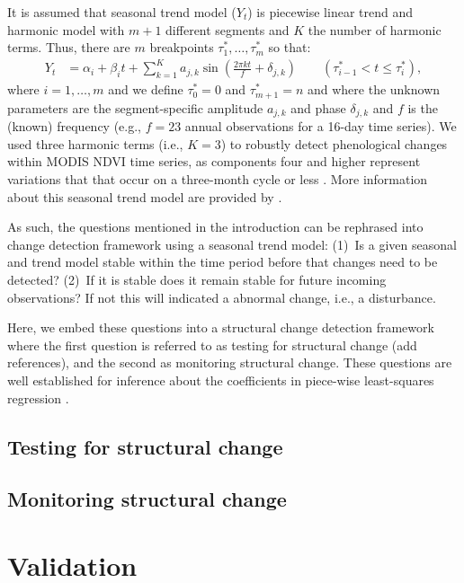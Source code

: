 \documentclass[authoryear,preprint,review,10pt]{elsarticle}
\begin{document}
It is assumed that seasonal trend model ($Y_t$) is piecewise linear trend and
harmonic model with $m+1$ different segments and $K$ the number of harmonic
terms. Thus, there are $m$ breakpoints $\tau_1^*, \dots, \tau_m^*$ so that:
%
\begin{align} \label{lmod}
  Y_t & = \alpha_i + \beta_i t + \sum_{k=1}^K a_{j,k} \sin\left(\frac{2\pi kt}{f}+\delta_{j,k}\right)  \qquad (\tau_{i-1}^* < t \leq \tau_i^*),
\end{align}
%
where $i = 1, \dots, m$ and we define $\tau_0^* = 0$ and $\tau_{m+1}^* = n$ and
where the unknown parameters are the segment-specific amplitude $a_{j,k}$ and
phase $\delta_{j,k}$ and $f$ is the (known) frequency (e.g., $f=23$ annual
observations for a 16-day time series). We used three harmonic terms (i.e.,
$K=3$) to robustly detect phenological changes within MODIS NDVI time series, as
components four and higher represent variations that that occur on a three-month
cycle or less \citep{Geerken2009,Julien2010}. More information about this
seasonal trend model are provided by \citet{Verbesselt:2010wo}.

As such, the questions mentioned in the introduction can be rephrased into
change detection framework using a seasonal trend model: (1)~Is a given seasonal
and trend model stable within the time period before that changes need to be
detected?  (2)~If it is stable does it remain stable for future incoming
observations? If not this will indicated a abnormal change, i.e., a disturbance.

Here, we embed these questions into a structural change detection framework
where the first question is referred to as testing for structural change (add
references), and the second as monitoring structural change. These questions are
well established for inference about the coefficients in piece-wise
least-squares regression  \citep{Zeileis2003}.

\subsection{Testing for structural change}

\subsection{Monitoring structural change}


\section{Validation}\label{sec:Validation}
\end{document}
